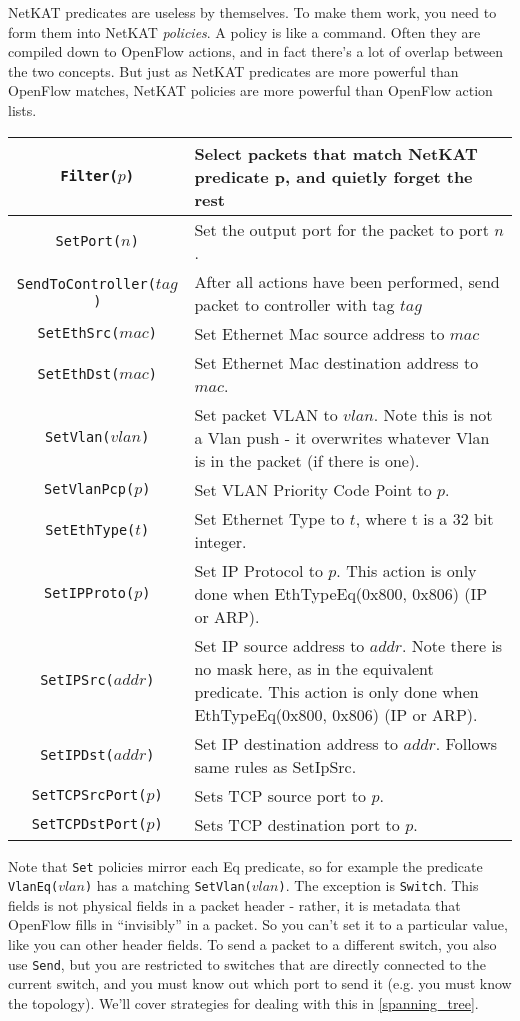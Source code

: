 NetKAT predicates are useless by themselves.  
To make them work, you need to form them into NetKAT \textit{policies}.
A policy is like a command.  
Often they are compiled down to OpenFlow actions, and in fact there's a lot of overlap between the two
concepts.
But just as NetKAT predicates are more powerful than OpenFlow matches, NetKAT policies are more
powerful than OpenFlow action lists.

\bigskip
\begin{tabularx}{6in}{|c|X|}
\hline\hline
\texttt{Filter($p$)} & Select packets that match NetKAT predicate p, and quietly forget the rest  
\\ \hline
\texttt{SetPort($n$)} & Set the output port for the packet to port $n$.    
\\ \hline
\texttt{SendToController($tag$)} & After all actions have been performed, send packet to controller with tag $tag$    
\\ \hline
\texttt{SetEthSrc($mac$)} & Set Ethernet Mac source address to $mac$
\\ \hline
\texttt{SetEthDst($mac$)} & Set Ethernet Mac destination address to $mac$.
\\ \hline
\texttt{SetVlan($vlan$)} & Set packet VLAN to $vlan$.  Note this is not a Vlan push - it overwrites whatever 
Vlan is in the packet (if there is one).  
\\ \hline
\texttt{SetVlanPcp($p$)} & Set VLAN Priority Code Point to $p$.
\\ \hline
\texttt{SetEthType($t$)} & Set Ethernet Type to $t$, where t is a 32 bit integer.
\\ \hline
\texttt{SetIPProto($p$)} & Set IP Protocol to $p$.    
This action is only done when EthTypeEq(0x800, 0x806) (IP or ARP). 
\\ \hline
\texttt{SetIPSrc($addr$)} & Set IP source address to $addr$.  Note there is no mask here, as in the equivalent predicate.  
This action is only done when EthTypeEq(0x800, 0x806) (IP or ARP). 
\\ \hline
\texttt{SetIPDst($addr$)} & Set IP destination address to $addr$.  
Follows same rules as SetIpSrc.
\\ \hline
\texttt{SetTCPSrcPort($p$)} & Sets TCP source port to $p$.
\\ \hline
\texttt{SetTCPDstPort($p$)} & Sets TCP destination port to $p$.  
\\ \hline\hline
\end{tabularx}
\bigskip

Note that \texttt{Set} policies mirror each Eq predicate, so for example the predicate \texttt{VlanEq($vlan$)} has a matching
\texttt{SetVlan($vlan$)}.
The exception is \texttt{Switch}.  
This fields is not physical fields in a packet header - rather, it is metadata that OpenFlow fills in ``invisibly''
in a packet.
So you can't set it to a particular value, like you can other header fields.
To send a packet to a different switch, you also use \texttt{Send}, but you are restricted to switches that are directly
connected to the current switch, and you must know out which port to send it (e.g. you must know the topology).
We'll cover strategies for dealing with this in \ref{spanning_tree}.
 
